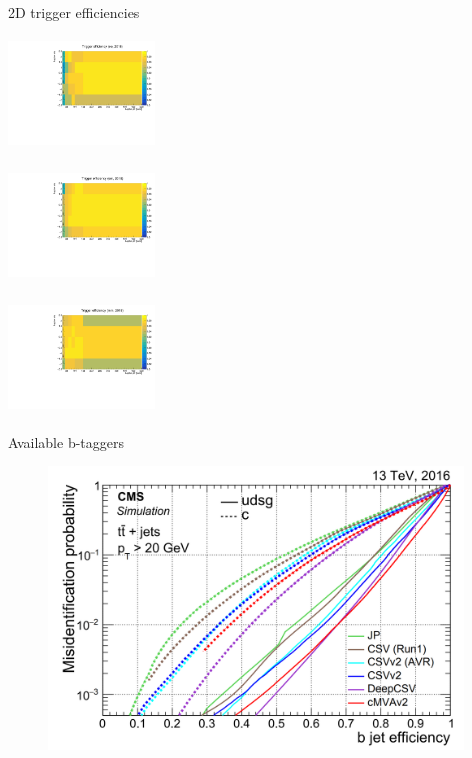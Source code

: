 \documentclass[8pt]{beamer}
\begin{document}
\begin{frame}{2D trigger efficiencies}
\vspace{-10pt}
\begin{minipage}[b]{.32\textwidth}
\begin{center}
\includegraphics[width=3.9cm, height=3cm]{figs/triggEff_2018_ee.pdf}
\end{center}
\end{minipage} \hfill
\begin{minipage}[b]{.32\textwidth}
\begin{center}
\includegraphics[width=3.9cm, height=3cm]{figs/triggEff_2018_em.pdf}
\end{center}
\end{minipage} \hfill
\begin{minipage}[b]{.32\textwidth}
\begin{center}
\includegraphics[width=3.9cm, height=3cm]{figs/triggEff_2018_mm.pdf}
\end{center}
\end{minipage} \vfill
\end{frame}

\begin{frame}{Available b-taggers}
\justifying
\begin{figure}[htbp]
\begin{center}
\includegraphics[width=11cm, height=7.5cm]{figs/CMSBTag.png}
\end{center}
\end{figure}
\end{frame}
\end{document}
